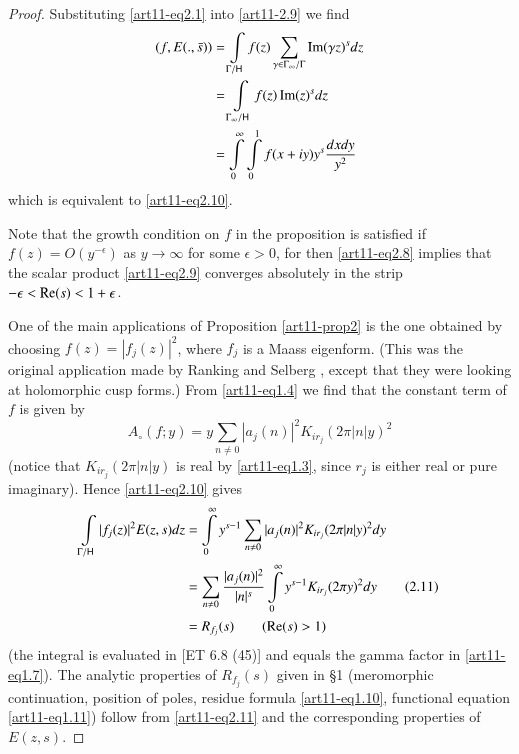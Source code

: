 \begin{proof}
Substituting \eqref{art11-eq2.1} into \eqref{art11-2.9} we find 
\begin{align*}
(f, E (., \bar{s})) & = \int\limits_{\Gamma / \mathsf{H}} f(z) \sum\limits_{\gamma  \in\Gamma_\infty/ \Gamma} \operatorname{Im} (\gamma z)^s dz \\
& =\int\limits_{\Gamma_\infty/ \mathsf{H}} f(z) \operatorname{Im} (z)^s dz\\
& = \int\limits^\infty_{0} \int\limits^1_0 f (x + iy) y^s \frac{dx dy}{y^2}
\end{align*}
which is equivalent to \eqref{art11-eq2.10}.

Note that the growth condition on $f$ in the proposition is satisfied if $f(z) = O (y^{-\epsilon})$ as $y \to \infty$ for some $\epsilon >0$, for then \eqref{art11-eq2.8} implies that the scalar product \eqref{art11-eq2.9} converges absolutely in the strip $-\epsilon < \operatorname{Re} (s) < 1+ \epsilon$.

One of the main applications of Proposition \eqref{art11-prop2} is the one obtained by choosing $f(z) = |f_j(z)|^2$, where $f_j$ is a Maass eigenform. (This was the original application made by Ranking \cite{art11-5} and Selberg \cite{art11-6}, except that they were looking at holomorphic cusp forms.) From \eqref{art11-eq1.4} we find that the constant term of $f$ is given by 
$$
A_\circ (f; y) = y \sum\limits_{n \neq 0} |a_j (n)|^2 K_{ir_j} (2\pi|n|y)^2
$$
(notice that $K_{ir_j} (2\pi|n|y)$ is real by \eqref{art11-eq1.3}, since $r_j$ is either real or pure imaginary). Hence \eqref{art11-eq2.10} gives 
\begin{align*}
\int\limits_{\Gamma / \mathsf{H}} |f_j(z)|^2 E (z,s) dz & = \int\limits^\infty_0 y^{s-1} \sum\limits_{n \neq 0} |a_j(n)|^2 K_{ir_j} (2 \pi |n| y)^2 dy\\
& = \sum\limits_{n \neq 0} \frac{|a_j(n)|^2}{|n|^s} \int\limits^\infty_{0} y^{s-1} K_{ir_j} (2\pi y)^2 dy \tag{2.11}\label{art11-eq2.11}\\
& = R_{f_j}(s) \qquad (\operatorname{Re} (s) > 1)
\end{align*}
(the integral is evaluated in [ET 6.8 (45)] and equals the gamma factor in \eqref{art11-eq1.7}). The analytic properties of $R_{f_j}(s)$ given in \S 1 (meromorphic continuation, position of poles, residue formula \eqref{art11-eq1.10}, functional equation \eqref{art11-eq1.11}) follow from \eqref{art11-eq2.11} and the corresponding properties of $E(z,s)$.
\end{proof}

